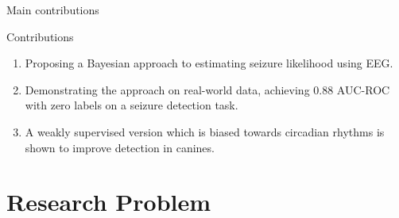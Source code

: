 \documentclass[t]{beamer}
\theoremstyle{definition}
\begin{document}
\begin{frame}{Main contributions}
    \begin{block}{Contributions}
        \begin{enumerate}[<+-|alert@+>]
            \item Proposing a Bayesian approach to estimating seizure likelihood using EEG.
                \item Demonstrating the approach on real-world data, achieving 0.88 AUC-ROC with zero labels on a seizure detection task.
                \item A weakly supervised version which is biased towards circadian rhythms is shown to improve detection in canines.
        \end{enumerate}
    \end{block}
\end{frame}


\section{Research Problem}

\end{document}
